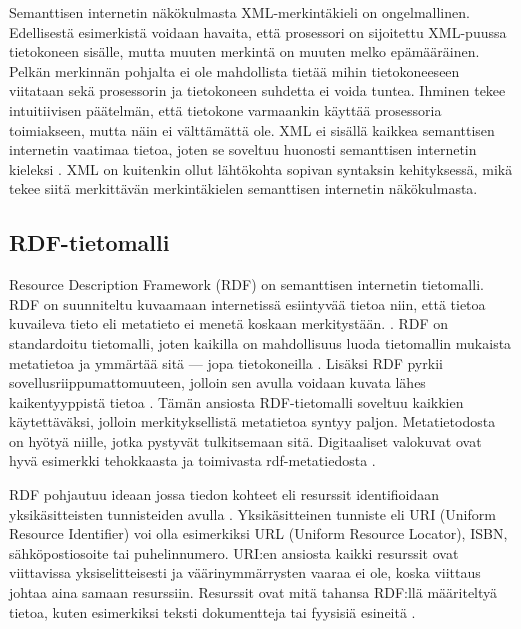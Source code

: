 \documentclass[finnish, 12pt, a4paper, elec, utf8, pdfa, online]{aaltothesis}
\begin{document}
 Semanttisen internetin näkökulmasta XML-merkintäkieli on ongelmallinen. Edellisestä esimerkistä voidaan havaita, että prosessori on sijoitettu XML-puussa tietokoneen sisälle, mutta muuten merkintä on muuten melko epämääräinen. Pelkän merkinnän pohjalta ei ole mahdollista tietää mihin tietokoneeseen viitataan sekä prosessorin ja tietokoneen suhdetta ei voida tuntea. Ihminen tekee intuitiivisen päätelmän, että tietokone varmaankin käyttää prosessoria toimiakseen, mutta näin ei välttämättä ole. XML ei sisällä kaikkea semanttisen internetin vaatimaa tietoa, joten se soveltuu huonosti semanttisen internetin kieleksi \cite{IEEE_XML}. XML on kuitenkin ollut lähtökohta sopivan syntaksin kehityksessä, mikä tekee siitä merkittävän merkintäkielen semanttisen internetin näkökulmasta.

\subsection{RDF-tietomalli}
Resource Description Framework (RDF) on semanttisen internetin tietomalli. RDF on suunniteltu kuvaamaan internetissä esiintyvää tietoa niin, että tietoa kuvaileva tieto eli metatieto ei menetä koskaan merkitystään. \cite{RDF_specification}. RDF on standardoitu tietomalli, joten kaikilla on mahdollisuus luoda tietomallin mukaista metatietoa ja ymmärtää sitä — jopa tietokoneilla \cite{metadata}. Lisäksi RDF pyrkii sovellusriippumattomuuteen, jolloin sen avulla voidaan kuvata lähes kaikentyyppistä tietoa \cite{RDF_specification}. Tämän ansiosta RDF-tietomalli soveltuu kaikkien käytettäväksi, jolloin merkityksellistä metatietoa syntyy paljon. Metatietodosta on hyötyä niille, jotka pystyvät tulkitsemaan sitä. Digitaaliset valokuvat ovat hyvä esimerkki tehokkaasta ja toimivasta rdf-metatiedosta  \cite{XMP} \cite{profium_metadata}.

RDF pohjautuu ideaan jossa tiedon kohteet eli resurssit identifioidaan yksikäsitteisten tunnisteiden avulla \cite{RDF_specification}. Yksikäsitteinen tunniste eli URI (Uniform Resource Identifier) voi olla esimerkiksi URL (Uniform Resource Locator), ISBN, sähköpostiosoite tai puhelinnumero. URI:en ansiosta kaikki resurssit ovat viittavissa yksiselitteisesti ja väärinymmärrysten vaaraa ei ole, koska viittaus johtaa aina samaan resurssiin. Resurssit ovat mitä tahansa RDF:llä määriteltyä tietoa, kuten esimerkiksi teksti dokumentteja tai fyysisiä esineitä \cite{RDF_specification}.
\end{document}
